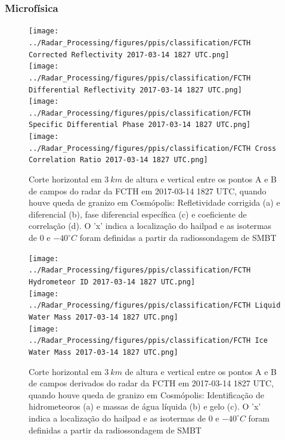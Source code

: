 \subsubsection{Microfísica}\label{micro_201703014}

\begin{figure}[hp]
	\centering
	\caption{Corte horizontal em $3\:km$ de altura e vertical entre os pontos A e B de campos do radar da FCTH em 2017-03-14 1827 UTC, quando houve queda de granizo em Cosmópolis: Refletividade corrigida (a) e diferencial (b), fase diferencial específica (c) e coeficiente de correlação (d). O 'x' indica a localização do hailpad e as isotermas de $0$ e $-40^{\circ}C$ foram definidas a partir da radiossondagem de SMBT}
	\label{radar_20170314_1}
	\vspace{-5pt}
	\texttt{[image: ../Radar\_Processing/figures/ppis/classification/FCTH Corrected Reflectivity 2017-03-14 1827 UTC.png]}
		\label{z_20170314_1} \\
	\vspace{-15pt}
	\texttt{[image: ../Radar\_Processing/figures/ppis/classification/FCTH Differential Reflectivity 2017-03-14 1827 UTC.png]}
		\label{zdr_20170314_1} \\
	\vspace{-15pt}
	\texttt{[image: ../Radar\_Processing/figures/ppis/classification/FCTH Specific Differential Phase 2017-03-14 1827 UTC.png]}
		\label{kdp_20170314_1} \\
	\vspace{-15pt}
	\texttt{[image: ../Radar\_Processing/figures/ppis/classification/FCTH Cross Correlation Ratio 2017-03-14 1827 UTC.png]}
		\label{rho_20170314_1} \\
	\vspace{-5pt}
\end{figure}

\begin{figure}[htb]
	\centering
	\caption{Corte horizontal em $3\:km$ de altura e vertical entre os pontos A e B de campos derivados do radar da FCTH em 2017-03-14 1827 UTC, quando houve queda de granizo em Cosmópolis: Identificação de hidrometeoros (a) e massas de água líquida (b) e gelo (c). O 'x' indica a localização do hailpad e as isotermas de $0$ e $-40^{\circ}C$ foram definidas a partir da radiossondagem de SMBT} 
	\label{radar_derived_20170314_1}
	\vspace{-5pt}
	\texttt{[image: ../Radar\_Processing/figures/ppis/classification/FCTH Hydrometeor ID 2017-03-14 1827 UTC.png]}
		\label{hid_20170314_1} \\
	\vspace{-15pt}
	\texttt{[image: ../Radar\_Processing/figures/ppis/classification/FCTH Liquid Water Mass 2017-03-14 1827 UTC.png]}
		\label{ml_20170314_1} \\
	\vspace{-15pt}
	\texttt{[image: ../Radar\_Processing/figures/ppis/classification/FCTH Ice Water Mass 2017-03-14 1827 UTC.png]}
		\label{mi_20170314_1} \\
	\vspace{-5pt}
\end{figure}


